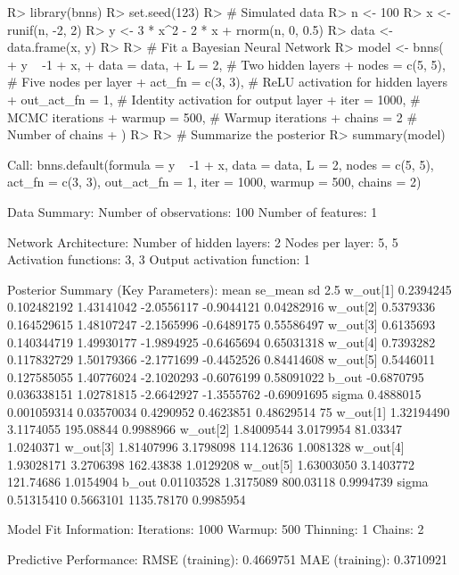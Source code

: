 \documentclass[
]{jss}
\begin{document}
\begin{CodeChunk}
\begin{CodeInput}
R> library(bnns)
R> set.seed(123)
R> # Simulated data
R> n <- 100
R> x <- runif(n, -2, 2)
R> y <- 3 * x^2 - 2 * x + rnorm(n, 0, 0.5)
R> data <- data.frame(x, y)
R> 
R> # Fit a Bayesian Neural Network
R> model <- bnns(
+   y ~ -1 + x,
+   data = data,
+   L = 2, # Two hidden layers
+   nodes = c(5, 5), # Five nodes per layer
+   act_fn = c(3, 3), # ReLU activation for hidden layers
+   out_act_fn = 1, # Identity activation for output layer
+   iter = 1000, # MCMC iterations
+   warmup = 500, # Warmup iterations
+   chains = 2 # Number of chains
+ )
R> 
R> # Summarize the posterior
R> summary(model)
\end{CodeInput}
\begin{CodeOutput}
Call:
bnns.default(formula = y ~ -1 + x, data = data, L = 2, nodes = c(5, 
    5), act_fn = c(3, 3), out_act_fn = 1, iter = 1000, warmup = 500, 
    chains = 2)

Data Summary:
Number of observations: 100 
Number of features: 1 

Network Architecture:
Number of hidden layers: 2 
Nodes per layer: 5, 5 
Activation functions: 3, 3 
Output activation function: 1 

Posterior Summary (Key Parameters):
               mean     se_mean         sd       2.5%
w_out[1]  0.2394245 0.102482192 1.43141042 -2.0556117 -0.9044121  0.04282916
w_out[2]  0.5379336 0.164529615 1.48107247 -2.1565996 -0.6489175  0.55586497
w_out[3]  0.6135693 0.140344719 1.49930177 -1.9894925 -0.6465694  0.65031318
w_out[4]  0.7393282 0.117832729 1.50179366 -2.1771699 -0.4452526  0.84414608
w_out[5]  0.5446011 0.127585055 1.40776024 -2.1020293 -0.6076199  0.58091022
b_out    -0.6870795 0.036338151 1.02781815 -2.6642927 -1.3555762 -0.69091695
sigma     0.4888015 0.001059314 0.03570034  0.4290952  0.4623851  0.48629514
                75%
w_out[1] 1.32194490 3.1174055  195.08844 0.9988966
w_out[2] 1.84009544 3.0179954   81.03347 1.0240371
w_out[3] 1.81407996 3.1798098  114.12636 1.0081328
w_out[4] 1.93028171 3.2706398  162.43838 1.0129208
w_out[5] 1.63003050 3.1403772  121.74686 1.0154904
b_out    0.01103528 1.3175089  800.03118 0.9994739
sigma    0.51315410 0.5663101 1135.78170 0.9985954

Model Fit Information:
Iterations: 1000 
Warmup: 500 
Thinning: 1 
Chains: 2 

Predictive Performance:
RMSE (training): 0.4669751 
MAE (training): 0.3710921 


\end{CodeOutput}
\end{CodeChunk}
\end{document}
